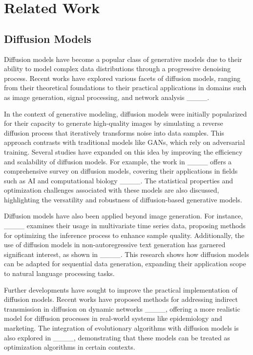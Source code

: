 \section{Related Work}
\subsection{Diffusion Models}

Diffusion models have become a popular class of generative models due to their ability to model complex data distributions through a progressive denoising process. Recent works have explored various facets of diffusion models, ranging from their theoretical foundations to their practical applications in domains such as image generation, signal processing, and network analysis ____.

In the context of generative modeling, diffusion models were initially popularized for their capacity to generate high-quality images by simulating a reverse diffusion process that iteratively transforms noise into data samples. This approach contrasts with traditional models like GANs, which rely on adversarial training. Several studies have expanded on this idea by improving the efficiency and scalability of diffusion models. For example, the work in ____ offers a comprehensive survey on diffusion models, covering their applications in fields such as AI and computational biology ____. The statistical properties and optimization challenges associated with these models are also discussed, highlighting the versatility and robustness of diffusion-based generative models.

Diffusion models have also been applied beyond image generation. For instance, ____ examines their usage in multivariate time series data, proposing methods for optimizing the inference process to enhance sample quality. Additionally, the use of diffusion models in non-autoregressive text generation has garnered significant interest, as shown in ____. This research shows how diffusion models can be adapted for sequential data generation, expanding their application scope to natural language processing tasks.

Further developments have sought to improve the practical implementation of diffusion models. Recent works have proposed methods for addressing indirect transmission in diffusion on dynamic networks ____, offering a more realistic model for diffusion processes in real-world systems like epidemiology and marketing. The integration of evolutionary algorithms with diffusion models is also explored in ____, demonstrating that these models can be treated as optimization algorithms in certain contexts.


